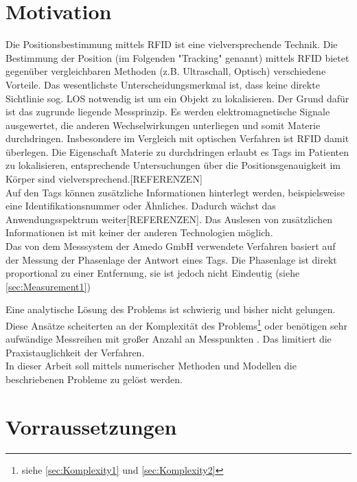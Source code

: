 \section[Motivation]{Motivation}

Die Positionsbestimmung mittels RFID ist eine vielversprechende Technik. Die Bestimmung der Position (im Folgenden "Tracking" genannt) mittels RFID  bietet gegenüber vergleichbaren Methoden (z.B. Ultraschall, Optisch) verschiedene Vorteile. Das wesentlichste Unterscheidungsmerkmal ist, dass keine direkte Sichtlinie sog. LOS notwendig ist um ein Objekt zu lokalisieren. Der Grund dafür ist das zugrunde liegende Messprinzip. Es werden elektromagnetische Signale ausgewertet, die anderen Wechselwirkungen unterliegen und somit Materie durchdringen. Insbesondere im Vergleich mit optischen Verfahren ist RFID damit überlegen. Die Eigenschaft Materie zu durchdringen erlaubt es Tags im Patienten zu lokalisieren, entsprechende Untersuchungen über die Positionsgenauigkeit im Körper sind vielversprechend.[REFERENZEN]\\
Auf den Tags können zusätzliche Informationen hinterlegt werden, beispielsweise eine Identifikationsnummer oder Ähnliches. Dadurch wächst das Anwendungsspektrum weiter[REFERENZEN]. Das Auslesen von zusätzlichen Informationen ist mit keiner der anderen Technologien möglich.\\
Das von dem Messsystem der {Amedo GmbH} verwendete Verfahren basiert auf der Messung der Phasenlage der Antwort eines Tags. Die Phasenlage ist direkt proportional zu einer Entfernung, sie ist jedoch nicht Eindeutig (siehe \ref{sec:Measurement1})

Eine analytische Lösung des Problems ist schwierig und bisher nicht gelungen. Diese Ansätze scheiterten an der Komplexität des Problems\footnote{siehe \ref{sec:Komplexity1} und \ref{sec:Komplexity2}} oder benötigen sehr aufwändige Messreihen mit großer Anzahl an Messpunkten \cite{amedo1}. Das limitiert die Praxistauglichkeit der Verfahren.\\
In dieser Arbeit soll mittels numerischer Methoden und Modellen die beschriebenen Probleme zu gelöst werden.

\section{Vorraussetzungen}
\lipsum[1-2]

